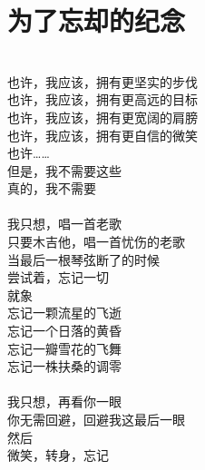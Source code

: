 \chapter{为了忘却的纪念}

\leftskip=25mm
\noindent \\
也许，我应该，拥有更坚实的步伐\\
也许，我应该，拥有更高远的目标\\
也许，我应该，拥有更宽阔的肩膀\\
也许，我应该，拥有更自信的微笑\\
也许……\\
但是，我不需要这些\\
真的，我不需要\\
\\
我只想，唱一首老歌\\
只要木吉他，唱一首忧伤的老歌\\
当最后一根琴弦断了的时候\\
尝试着，忘记一切\\
就象\\
忘记一颗流星的飞逝\\
忘记一个日落的黄昏\\
忘记一瓣雪花的飞舞\\
忘记一株扶桑的调零\\
\\
我只想，再看你一眼\\
你无需回避，回避我这最后一眼\\
然后\\
微笑，转身，忘记
